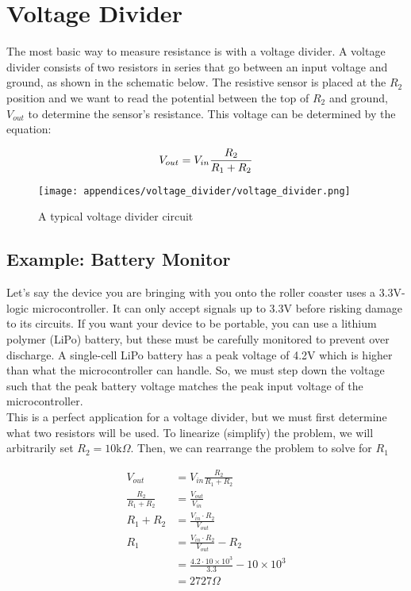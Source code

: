 \chapter{Voltage Divider} 
The most basic way to measure resistance is with a voltage divider.
A voltage divider consists of two resistors in series that go between an input voltage and ground, as shown in the schematic below.
The resistive sensor is placed at the $R_2$ position and we want to read the potential between the top of $R_2$ and ground, $V_{out}$ to determine the sensor's resistance.
This voltage can be determined by the equation:

\begin{equation} \labeq{voltage_divider}
    V_{out} = V_{in} \frac{R_2}{R_1 + R_2}
\end{equation}

\begin{figure}[h!]
    \caption{A typical voltage divider circuit}
    \centering
    \texttt{[image: appendices/voltage\_divider/voltage\_divider.png]}
\end{figure}

\section{Example: Battery Monitor}
    Let's say the device you are bringing with you onto the roller coaster uses a 3.3V-logic microcontroller.
    It can only accept signals up to 3.3V before risking damage to its circuits.
    If you want your device to be portable, you can use a lithium polymer (LiPo) battery, but these must be carefully monitored to prevent over discharge.
    A single-cell LiPo battery has a peak voltage of 4.2V which is higher than what the microcontroller can handle.
    So, we must step down the voltage such that the peak battery voltage matches the peak input voltage of the microcontroller. \\
    
    This is a perfect application for a voltage divider, but we must first determine what two resistors will be used.
    To linearize (simplify) the problem, we will arbitrarily set $R_2 = 10\text{k} \Omega$.
    Then, we can rearrange the problem to solve for $R_1$
    
    \begin{align*}
        V_{out}                 &= V_{in} \frac{R_2}{R_1 + R_2} \\
        \frac{R_2}{R_1 + R_2}   &= \frac{V_{out}}{V_{in}} \\
        R_1 + R_2               &= \frac{V_{in} \cdot R_2}{V_{out}}\\
        R_1                     &= \frac{V_{in} \cdot R_2}{V_{out}} - R_2 \\
                                &= \frac{4.2 \cdot 10\times10^3}{3.3} - 10\times10^3 \\
                                &= 2727 \Omega
    \end{align*}

